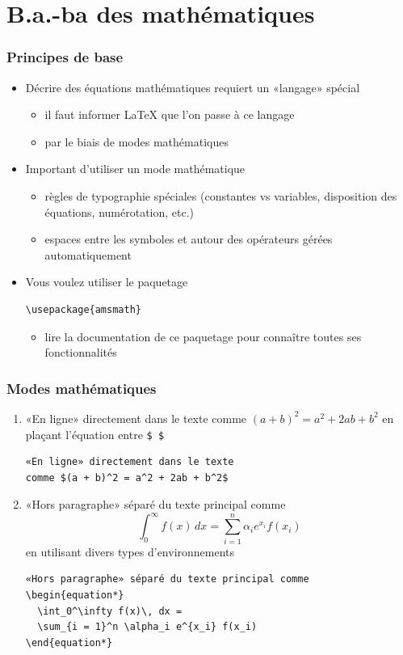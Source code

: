 \section{B.a.-ba des mathématiques}

\begin{frame}[fragile=singleslide]
  \frametitle{Principes de base}
  \begin{itemize}
  \item Décrire des équations mathématiques requiert un «langage» spécial
    \begin{itemize}
    \item il faut informer {\LaTeX} que l'on passe à ce langage
    \item par le biais de modes mathématiques
    \end{itemize}
  \item Important d'utiliser un mode mathématique
    \begin{itemize}
    \item règles de typographie spéciales (constantes vs variables,
      disposition des équations, numérotation, etc.)
    \item espaces entre les symboles et autour des opérateurs gérées
      automatiquement
    \end{itemize}
  \item Vous voulez utiliser le paquetage 
\begin{lstlisting}
\usepackage{amsmath}
\end{lstlisting}
    \begin{itemize}
    \item lire la documentation de ce paquetage pour connaître toutes
      ses fonctionnalités
    \end{itemize}
  \end{itemize}
\end{frame}

\begin{frame}[fragile]
  \frametitle{Modes mathématiques}
  \begin{enumerate}[<+->]
  \item «En ligne» directement dans le texte comme $(a + b)^2 = a^2 +
    2ab + b^2$ en plaçant l'équation entre \verb=$ $=
\begin{lstlisting}
«En ligne» directement dans le texte
comme $(a + b)^2 = a^2 + 2ab + b^2$
\end{lstlisting}
  \item «Hors paragraphe» séparé du texte principal comme
    \begin{equation*}
      \int_0^\infty f(x)\, dx = \sum_{i = 1}^n \alpha_i e^{x_i} f(x_i)
    \end{equation*}
    en utilisant divers types d'environnements
\begin{lstlisting}
«Hors paragraphe» séparé du texte principal comme
\begin{equation*}
  \int_0^\infty f(x)\, dx =
  \sum_{i = 1}^n \alpha_i e^{x_i} f(x_i)
\end{equation*}
\end{lstlisting}
  \end{enumerate}
\end{frame}

